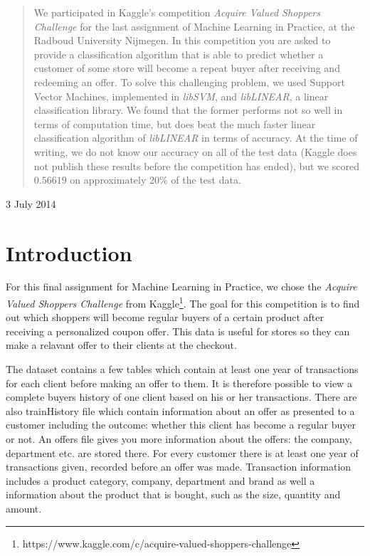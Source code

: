 \documentclass[a4paper]{article}
\begin{document}
\begin{titlepage}
\begin{center}
	\begin{abstract}
		We participated in Kaggle's competition \emph{Acquire Valued Shoppers Challenge} for the last assignment of Machine Learning in Practice, at the Radboud University Nijmegen. In this competition you are asked to provide a classification algorithm that is able to predict whether a customer of some store will become a repeat buyer after receiving and redeeming an offer. To solve this challenging problem, we used Support Vector Machines, implemented in \emph{libSVM}, and \emph{libLINEAR}, a linear classification library. We found that the former performs not so well in terms of computation time, but does beat the much faster linear classification algorithm of \emph{libLINEAR} in terms of accuracy. At the time of writing, we do not know our accuracy on all of the test data (Kaggle does not publish these results before the competition has ended), but we scored $0.56619$ on approximately 20\% of the test data.
	\end{abstract}
	\vspace{.7cm}

	{\large 3 July 2014}
	\vfill
	\end{center}

\end{titlepage}

\newpage

\section{Introduction}
For this final assignment for Machine Learning in Practice, we chose the \emph{Acquire Valued Shoppers Challenge} from Kaggle\footnote{https://www.kaggle.com/c/acquire-valued-shoppers-challenge}. The goal for this competition is to find out which shoppers will become regular buyers of a certain product after receiving a personalized coupon offer. This data is useful for stores so they can make a relavant offer to their clients at the checkout.

The dataset contains a few tables which contain at least one year of transactions for each client before making an offer to them. It is therefore possible to view a complete buyers history of one client based on his or her transactions. There are also trainHistory file which contain information about an offer as presented to a customer including the outcome: whether this client has become a regular buyer or not. An offers file gives you more information about the offers: the company, department etc. are stored there. For every customer there is at least one year of transactions given, recorded before an offer was made. Transaction information includes a product category, company, department and brand as well a information about the product that is bought, such as the size, quantity and amount.
\end{document}
